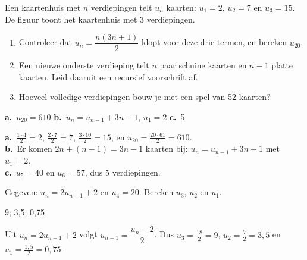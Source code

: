 \begin{oefeningen}
\begin{oefening}[2]
\begin{minipage}[t]{.72\linewidth}
Een kaartenhuis met $n$ verdiepingen telt $u_n$ kaarten: $u_1 = 2$, $u_2 = 7$ en $u_3 = 15$. De figuur toont het kaartenhuis met 3 verdiepingen.
\end{minipage}\hfill
\begin{minipage}[t]{.24\linewidth}
\vspace{-3mm}
\end{minipage}
\begin{enumerate}
  \item Controleer dat $u_n = \dfrac{n(3n+1)}{2}$ klopt voor deze drie termen, en bereken $u_{20}$.
  \item Een nieuwe onderste verdieping telt $n$ paar schuine kaarten en $n-1$ platte kaarten. Leid daaruit een recursief voorschrift af.
  \item Hoeveel volledige verdiepingen bouw je met een spel van 52 kaarten?
\end{enumerate}
\begin{solution}
\textbf{a.}~$u_{20}=610$ \quad \textbf{b.}~$u_n=u_{n-1}+3n-1$, $u_1=2$ \quad \textbf{c.}~5
\end{solution}
\begin{fullsolution}
\textbf{a.}~$\tfrac{1\cdot 4}{2}=2$, $\tfrac{2\cdot 7}{2}=7$, $\tfrac{3\cdot 10}{2}=15$, en $u_{20}=\tfrac{20\cdot 61}{2}=610$.\\
\textbf{b.}~Er komen $2n+(n-1)=3n-1$ kaarten bij: $u_n=u_{n-1}+3n-1$ met $u_1=2$.\\
\textbf{c.}~$u_5=40$ en $u_6=57$, dus 5 verdiepingen.
\end{fullsolution}
\end{oefening}

\begin{oefening}[2]
Gegeven: $u_n = 2u_{n-1} + 2$ en $u_4 = 20$. Bereken $u_3$, $u_2$ en $u_1$.
\begin{solution}
9; 3,5; 0,75
\end{solution}
\begin{fullsolution}
Uit $u_n=2u_{n-1}+2$ volgt $u_{n-1}=\dfrac{u_n-2}{2}$. Dus $u_3=\tfrac{18}{2}=9$, $u_2=\tfrac72=3{,}5$ en $u_1=\tfrac{1{,}5}{2}=0{,}75$.
\end{fullsolution}
\end{oefening}


\end{oefeningen}
